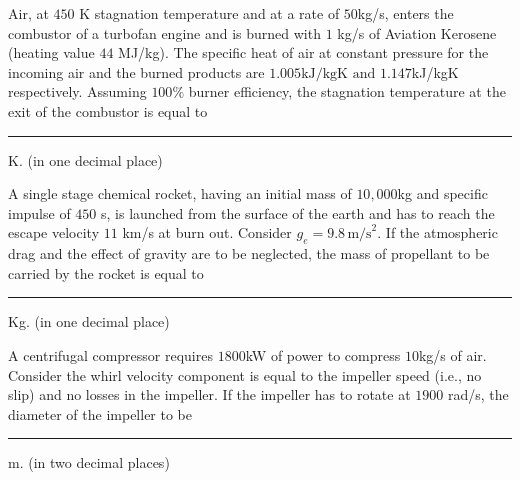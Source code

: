 \item Air, at $450$ K stagnation temperature and at a rate of $50 $kg/s, enters the combustor of a turbofan engine and is burned with $1$ kg/s of Aviation Kerosene (heating value $44$ MJ/kg). The specific heat of air at constant pressure for the incoming air and the burned products are $1.005 \text{kJ/kgK} \text{ and } 1.147 $kJ/kgK  respectively. Assuming $100\%$ burner efficiency, the stagnation temperature at the exit of the combustor is equal to \rule{1cm}{0.4 pt} K. (in one decimal place) 

\item A single stage chemical rocket, having an initial mass of $10,000 $kg and specific impulse of $450$ s, is launched from the surface of the earth and has to reach the escape velocity $11$ km/s at burn out. Consider $ g_e = 9.8 \, {\text{m/s}}^2 $. If the atmospheric drag and the effect of gravity are to be neglected, the mass of propellant to be carried by the rocket is equal to \rule{1cm}{0.4 pt} Kg. (in one decimal place) 

\item A centrifugal compressor requires $1800 $kW of power to compress $10 $kg/s of air. Consider the whirl velocity component is equal to the impeller speed (i.e., no slip) and no losses in the impeller. If the impeller has to rotate at $1900$ rad/s, the diameter of the impeller to be \rule{1cm}{0.4 pt} m. (in two decimal places) 

